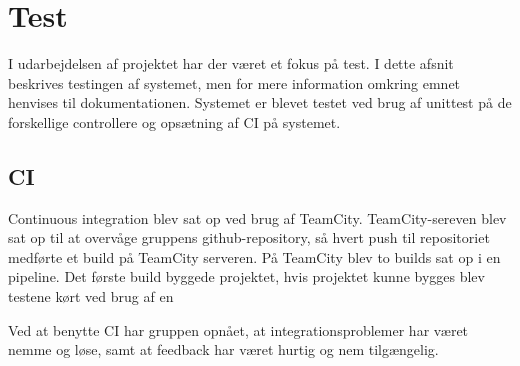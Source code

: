 \chapter{Test}
I udarbejdelsen af projektet har der været et fokus på test. I dette afsnit beskrives testingen af systemet, men for mere information omkring emnet henvises til dokumentationen.
Systemet er blevet testet ved brug af unittest på de forskellige controllere og opsætning af CI på systemet.

\section{CI}
Continuous integration blev sat op ved brug af TeamCity. TeamCity-sereven blev sat op til at overvåge gruppens github-repository, så hvert push til repositoriet medførte et build på TeamCity serveren. På TeamCity blev to builds sat op i en pipeline. Det første build byggede projektet, hvis projektet kunne bygges blev testene kørt ved brug af en 

Ved at benytte CI har gruppen opnået, at integrationsproblemer har været nemme og løse, samt at feedback har været hurtig og nem tilgængelig.